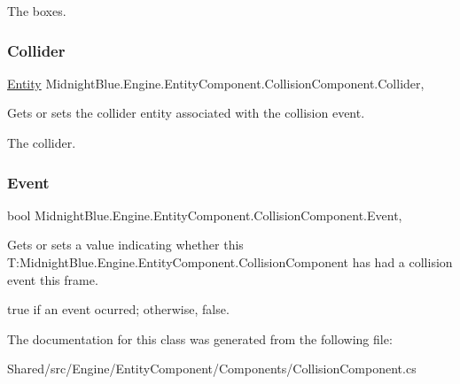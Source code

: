 The boxes.\hypertarget{class_midnight_blue_1_1_engine_1_1_entity_component_1_1_collision_component_a02a5ffafd3739b8e1a822f471938951a}{}\label{class_midnight_blue_1_1_engine_1_1_entity_component_1_1_collision_component_a02a5ffafd3739b8e1a822f471938951a} 
\subsubsection{\texorpdfstring{Collider}{Collider}}
{\footnotesize\ttfamily \hyperlink{class_midnight_blue_1_1_engine_1_1_entity_component_1_1_entity}{Entity} Midnight\+Blue.\+Engine.\+Entity\+Component.\+Collision\+Component.\+Collider\hspace{0.3cm}{\ttfamily [get]}, {\ttfamily [set]}}



Gets or sets the collider entity associated with the collision event. 

The collider.\hypertarget{class_midnight_blue_1_1_engine_1_1_entity_component_1_1_collision_component_a7eb74261b13d9d7fda8568886316c087}{}\label{class_midnight_blue_1_1_engine_1_1_entity_component_1_1_collision_component_a7eb74261b13d9d7fda8568886316c087} 
\subsubsection{\texorpdfstring{Event}{Event}}
{\footnotesize\ttfamily bool Midnight\+Blue.\+Engine.\+Entity\+Component.\+Collision\+Component.\+Event\hspace{0.3cm}{\ttfamily [get]}, {\ttfamily [set]}}



Gets or sets a value indicating whether this T\+:\+Midnight\+Blue.\+Engine.\+Entity\+Component.\+Collision\+Component has had a collision event this frame. 

{\ttfamily true} if an event ocurred; otherwise, {\ttfamily false}.

The documentation for this class was generated from the following file\+:\begin{DoxyCompactItemize}
\item 
Shared/src/\+Engine/\+Entity\+Component/\+Components/Collision\+Component.\+cs\end{DoxyCompactItemize}
